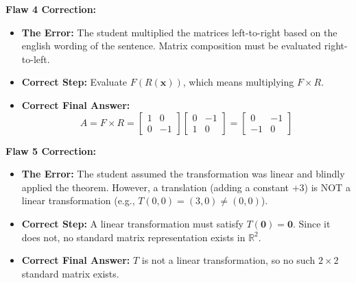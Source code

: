 \documentclass[11pt]{article}
\begin{document}
\textbf{Flaw 4 Correction:}
\begin{itemize}
    \item \textbf{The Error:} The student multiplied the matrices left-to-right based on the english wording of the sentence. Matrix composition must be evaluated right-to-left. 
    \item \textbf{Correct Step:} Evaluate $F(R(\mathbf{x}))$, which means multiplying $F \times R$.
    \item \textbf{Correct Final Answer:} 
    \[ A = F \times R = \begin{bmatrix} 1 & 0 \\ 0 & -1 \end{bmatrix} \begin{bmatrix} 0 & -1 \\ 1 & 0 \end{bmatrix} = \begin{bmatrix} 0 & -1 \\ -1 & 0 \end{bmatrix} \]
\end{itemize}

\textbf{Flaw 5 Correction:}
\begin{itemize}
    \item \textbf{The Error:} The student assumed the transformation was linear and blindly applied the theorem. However, a translation (adding a constant $+3$) is NOT a linear transformation (e.g., $T(0,0) = (3,0) \neq (0,0)$).
    \item \textbf{Correct Step:} A linear transformation must satisfy $T(\mathbf{0}) = \mathbf{0}$. Since it does not, no standard matrix representation exists in $\mathbb{R}^2$.
    \item \textbf{Correct Final Answer:} $T$ is not a linear transformation, so no such $2 \times 2$ standard matrix exists.
\end{itemize}
\end{document}
